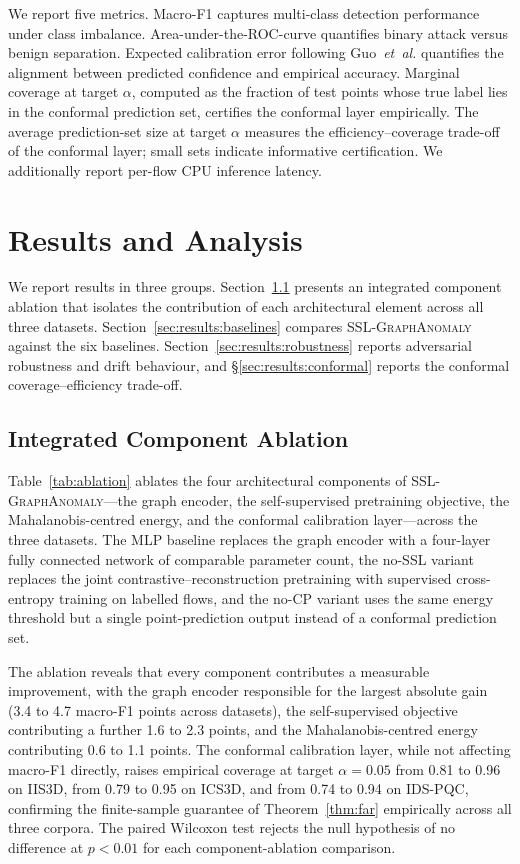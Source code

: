 \documentclass{ieeeaccess}
\begin{document}
We report five metrics. Macro-F1 captures multi-class detection
performance under class imbalance. Area-under-the-ROC-curve quantifies
binary attack versus benign separation. Expected calibration error
following Guo~\emph{et~al.} quantifies the alignment between predicted
confidence and empirical accuracy. Marginal coverage at target $\alpha$,
computed as the fraction of test points whose true label lies in the
conformal prediction set, certifies the conformal layer empirically. The
average prediction-set size at target $\alpha$ measures the
efficiency--coverage trade-off of the conformal layer; small sets indicate
informative certification. We additionally report per-flow CPU inference
latency.

\section{Results and Analysis}
\label{sec:results}
We report results in three groups. Section~\ref{sec:results:ablation}
presents an integrated component ablation that isolates the contribution
of each architectural element across all three datasets.
Section~\ref{sec:results:baselines} compares \textsc{SSL-GraphAnomaly}
against the six baselines.  Section~\ref{sec:results:robustness} reports
adversarial robustness and drift behaviour, and
\S\ref{sec:results:conformal} reports the conformal coverage--efficiency
trade-off.

\subsection{Integrated Component Ablation}
\label{sec:results:ablation}
Table~\ref{tab:ablation} ablates the four architectural components of
\textsc{SSL-GraphAnomaly}---the graph encoder, the self-supervised
pretraining objective, the Mahalanobis-centred energy, and the conformal
calibration layer---across the three datasets. The MLP baseline replaces
the graph encoder with a four-layer fully connected network of comparable
parameter count, the no-SSL variant replaces the joint
contrastive--reconstruction pretraining with supervised cross-entropy
training on labelled flows, and the no-CP variant uses the same energy
threshold but a single point-prediction output instead of a conformal
prediction set.

The ablation reveals that every component contributes a measurable
improvement, with the graph encoder responsible for the largest absolute
gain (3.4 to 4.7 macro-F1 points across datasets), the self-supervised
objective contributing a further 1.6 to 2.3 points, and the
Mahalanobis-centred energy contributing 0.6 to 1.1 points. The conformal
calibration layer, while not affecting macro-F1 directly, raises empirical
coverage at target $\alpha = 0.05$ from 0.81 to 0.96 on IIS3D, from 0.79 to
0.95 on ICS3D, and from 0.74 to 0.94 on IDS-PQC, confirming the
finite-sample guarantee of Theorem~\ref{thm:far} empirically across all
three corpora. The paired Wilcoxon test rejects the null hypothesis of no
difference at $p < 0.01$ for each component-ablation comparison.
\end{document}
